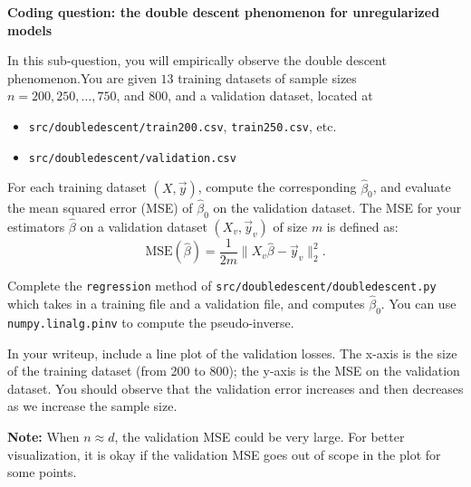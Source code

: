 \item {} \textbf{Coding question: the double descent phenomenon for unregularized models}

In this sub-question, you will empirically observe the double descent phenomenon.You are given $13$ training datasets of sample sizes $n  = 200, 250, \dots, 750$, and $800$, and a validation dataset, located at
\begin{itemize}
	\item \texttt{src/doubledescent/train200.csv}, \texttt{train250.csv}, etc.
	\item \texttt{src/doubledescent/validation.csv}
\end{itemize} 

For each training dataset $(X, \vec{y})$, compute the corresponding $\hat{\beta}_0$, and evaluate the mean squared error (MSE) of $\hat{\beta}_0$ on the validation dataset. The MSE for your estimators $\hat{\beta}$ on a validation dataset $(X_v, \vec{y}_v)$ of size $m$ is defined as: $$\text{MSE}(\hat{\beta}) = \frac{1}{2m} \|X_v \hat{\beta}-\vec{y}_v\|^2_2.$$


Complete the \texttt{regression} method of \texttt{src/doubledescent/doubledescent.py} which takes in a training file and a validation file, and computes $\hat{\beta}_0$. You can use \texttt{numpy.linalg.pinv} to compute the pseudo-inverse.

In your writeup, include a line plot of the validation losses. The x-axis is the size of the training dataset (from 200 to 800); the y-axis is the MSE on the validation dataset. You should observe that the validation error increases and then decreases as we increase the sample size.  

\textbf{Note:} When $n\approx d$, the validation MSE could be very large. For better visualization, it is okay if the validation MSE goes out of scope in the plot for some points.